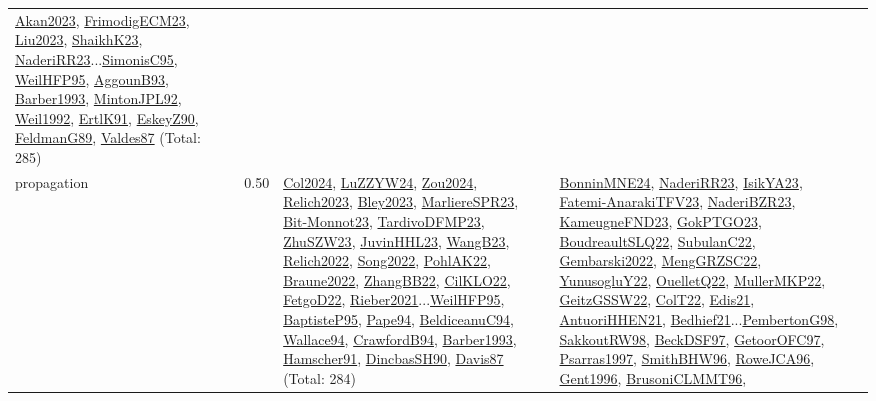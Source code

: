 {\begin{longtable}{p{3cm}r>{\raggedright\arraybackslash}p{6cm}>{\raggedright\arraybackslash}p{6cm}>{\raggedright\arraybackslash}p{8cm}}
\hyperref[detail:Akan2023]{Akan2023}, \hyperref[detail:FrimodigECM23]{FrimodigECM23}, \hyperref[detail:Liu2023]{Liu2023}, \hyperref[detail:ShaikhK23]{ShaikhK23}, \hyperref[detail:NaderiRR23]{NaderiRR23}...\hyperref[detail:SimonisC95]{SimonisC95}, \hyperref[detail:WeilHFP95]{WeilHFP95}, \hyperref[detail:AggounB93]{AggounB93}, \hyperref[detail:Barber1993]{Barber1993}, \hyperref[detail:MintonJPL92]{MintonJPL92}, \hyperref[detail:Weil1992]{Weil1992}, \hyperref[detail:ErtlK91]{ErtlK91}, \hyperref[detail:EskeyZ90]{EskeyZ90}, \hyperref[detail:FeldmanG89]{FeldmanG89}, \hyperref[detail:Valdes87]{Valdes87} (Total: 285)\\
\index{propagation}\index{CP!propagation}propagation &  0.50 & \hyperref[detail:Col2024]{Col2024}, \hyperref[detail:LuZZYW24]{LuZZYW24}, \hyperref[detail:Zou2024]{Zou2024}, \hyperref[detail:Relich2023]{Relich2023}, \hyperref[detail:Bley2023]{Bley2023}, \hyperref[detail:MarliereSPR23]{MarliereSPR23}, \hyperref[detail:Bit-Monnot23]{Bit-Monnot23}, \hyperref[detail:TardivoDFMP23]{TardivoDFMP23}, \hyperref[detail:ZhuSZW23]{ZhuSZW23}, \hyperref[detail:JuvinHHL23]{JuvinHHL23}, \hyperref[detail:WangB23]{WangB23}, \hyperref[detail:Relich2022]{Relich2022}, \hyperref[detail:Song2022]{Song2022}, \hyperref[detail:PohlAK22]{PohlAK22}, \hyperref[detail:Braune2022]{Braune2022}, \hyperref[detail:ZhangBB22]{ZhangBB22}, \hyperref[detail:CilKLO22]{CilKLO22}, \hyperref[detail:FetgoD22]{FetgoD22}, \hyperref[detail:Rieber2021]{Rieber2021}...\hyperref[detail:WeilHFP95]{WeilHFP95}, \hyperref[detail:BaptisteP95]{BaptisteP95}, \hyperref[detail:Pape94]{Pape94}, \hyperref[detail:BeldiceanuC94]{BeldiceanuC94}, \hyperref[detail:Wallace94]{Wallace94}, \hyperref[detail:CrawfordB94]{CrawfordB94}, \hyperref[detail:Barber1993]{Barber1993}, \hyperref[detail:Hamscher91]{Hamscher91}, \hyperref[detail:DincbasSH90]{DincbasSH90}, \hyperref[detail:Davis87]{Davis87} (Total: 284) & \hyperref[detail:BonninMNE24]{BonninMNE24}, \hyperref[detail:NaderiRR23]{NaderiRR23}, \hyperref[detail:IsikYA23]{IsikYA23}, \hyperref[detail:Fatemi-AnarakiTFV23]{Fatemi-AnarakiTFV23}, \hyperref[detail:NaderiBZR23]{NaderiBZR23}, \hyperref[detail:KameugneFND23]{KameugneFND23}, \hyperref[detail:GokPTGO23]{GokPTGO23}, \hyperref[detail:BoudreaultSLQ22]{BoudreaultSLQ22}, \hyperref[detail:SubulanC22]{SubulanC22}, \hyperref[detail:Gembarski2022]{Gembarski2022}, \hyperref[detail:MengGRZSC22]{MengGRZSC22}, \hyperref[detail:YunusogluY22]{YunusogluY22}, \hyperref[detail:OuelletQ22]{OuelletQ22}, \hyperref[detail:MullerMKP22]{MullerMKP22}, \hyperref[detail:GeitzGSSW22]{GeitzGSSW22}, \hyperref[detail:ColT22]{ColT22}, \hyperref[detail:Edis21]{Edis21}, \hyperref[detail:AntuoriHHEN21]{AntuoriHHEN21}, \hyperref[detail:Bedhief21]{Bedhief21}...\hyperref[detail:PembertonG98]{PembertonG98}, \hyperref[detail:SakkoutRW98]{SakkoutRW98}, \hyperref[detail:BeckDSF97]{BeckDSF97}, \hyperref[detail:GetoorOFC97]{GetoorOFC97}, \hyperref[detail:Psarras1997]{Psarras1997}, \hyperref[detail:SmithBHW96]{SmithBHW96}, \hyperref[detail:RoweJCA96]{RoweJCA96}, \hyperref[detail:Gent1996]{Gent1996}, \hyperref[detail:BrusoniCLMMT96]{BrusoniCLMMT96}, 
\end{longtable}}
